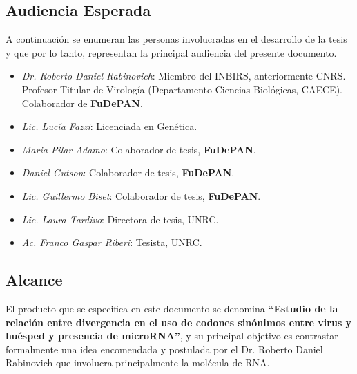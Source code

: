 \documentclass[12pt,a4paper,spanish]{article}
\begin{document}
\subsection{Audiencia Esperada}
\par A continuación se enumeran las personas involucradas en el desarrollo de la
tesis y que por lo tanto, representan la principal audiencia del presente documento.
\begin{itemize}
	\item \textit{Dr. Roberto Daniel Rabinovich}: Miembro del INBIRS, anteriormente CNRS. Profesor Titular de Virología (Departamento Ciencias Biológicas,
 												CAECE). Colaborador de \textbf{FuDePAN}.
	\item \textit{Lic. Lucía Fazzi}: Licenciada en Genética.
	\item \textit{Maria Pilar Adamo}: Colaborador de tesis, \textbf{FuDePAN}. 
	\item \textit{Daniel Gutson}: Colaborador de tesis, \textbf{FuDePAN}. 
	\item \textit{Lic. Guillermo Biset}: Colaborador de tesis, \textbf{FuDePAN}. 
	\item \textit{Lic. Laura Tardivo}: Directora de tesis, UNRC. 
	\item \textit{Ac. Franco Gaspar Riberi}: Tesista, UNRC.
\end{itemize}

\subsection{Alcance}
\par El producto que se especifica en este documento se denomina \textbf{``Estudio de la relación entre divergencia en el uso de codones 
sinónimos entre virus y huésped y presencia de microRNA''}, y su principal objetivo es contrastar formalmente una idea encomendada y
postulada por el Dr. Roberto Daniel Rabinovich que involucra principalmente 
la molécula de RNA. 
\end{document}
